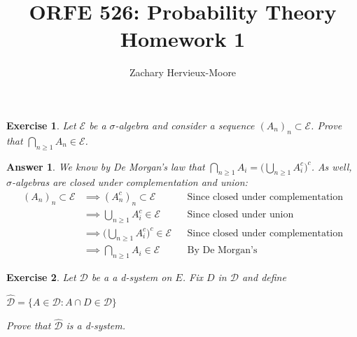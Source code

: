 \documentclass[12pt]{article}
\title{ORFE 526: Probability Theory \\ Homework 1}
\author{Zachary Hervieux-Moore}
\date{\displaydate{date}}
\theoremstyle{colon}
\newtheorem{exercise}{Exercise}
\newtheorem*{answer}{Answer}
\begin{document}
\maketitle

\clearpage

\begin{exercise}
  Let $\mathcal{E}$ be a $\sigma$-algebra and consider a sequence $(A_n)_n \subset \mathcal{E}$. Prove that $\bigcap\limits_{n \geq 1} A_n \in \mathcal{E}$.
\end{exercise}

\begin{answer}
  We know by De Morgan's law that $\bigcap\limits_{n \geq 1} A_i = \Big( \bigcup\limits_{n \geq 1} A_i^c \Big)^c$. As well, $\sigma$-algebras are closed under complementation and union:
  \begin{align*}
      (A_n)_n \subset \mathcal{E} &\implies (A_n^c)_n \subset \mathcal{E} && \text{Since closed under complementation}\\
      &\implies \bigcup\limits_{n \geq 1} A_i^c \in \mathcal{E} && \text{Since closed under union} \\
      &\implies \Big( \bigcup\limits_{n \geq 1} A_i^c \Big)^c \in \mathcal{E} && \text{Since closed under complementation} \\
      &\implies \bigcap\limits_{n \geq 1} A_i \in \mathcal{E}  && \text{By De Morgan's}
  \end{align*}
\end{answer}

\clearpage

\begin{exercise}
  Let $\mathcal{D}$ be a a d-system on $E$. Fix $D$ in $\mathcal{D}$ and define
  \begin{center}
    $\widehat{\mathcal{D}} = \{A \in \mathcal{D}: A \cap D \in \mathcal{D}\}$
  \end{center}
  Prove that $\widehat{\mathcal{D}}$ is a d-system.
\end{exercise}
\end{document}
